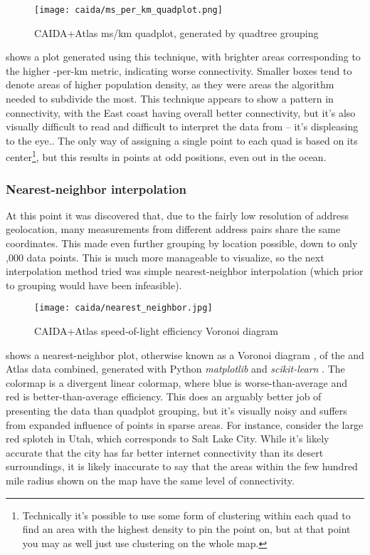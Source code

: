 \begin{figure}[h]
    \centering
    \texttt{[image: caida/ms\_per\_km\_quadplot.png]}
    \caption{CAIDA+Atlas ms/km quadplot, generated by quadtree grouping}
    \label{fig:quadtree_grouping}
\end{figure}

 shows a plot generated using this technique, with brighter areas corresponding to the higher \rtt-per-km metric, indicating worse connectivity. Smaller boxes tend to denote areas of higher population density, as they were areas the algorithm needed to subdivide the most. This technique appears to show a pattern in connectivity, with the East coast having overall better connectivity, but it's also visually difficult to read and difficult to interpret the data from -- it's displeasing to the eye.. The only way of assigning a single point to each quad is based on its center\footnote{Technically it's possible to use some form of clustering within each quad to find an area with the highest density to pin the point on, but at that point you may as well just use clustering on the whole map.}, but this results in points at odd positions, even out in the ocean.

\subsubsection{Nearest-neighbor interpolation}

At this point it was discovered that, due to the fairly low resolution of \ip address geolocation, many measurements from different \ip address pairs share the same coordinates. This made even further grouping by location possible, down to only ,000 data points. This is much more manageable to visualize, so the next interpolation method tried was simple nearest-neighbor interpolation (which prior to grouping would have been infeasible).

\begin{figure}[h]
    \centering
    \texttt{[image: caida/nearest\_neighbor.jpg]}
    \caption{CAIDA+Atlas speed-of-light efficiency Voronoi diagram}
    \label{fig:caida_nearest_neighbor}
\end{figure}

 shows a nearest-neighbor plot, otherwise known as a Voronoi diagram \cite{Malhotra2017LoveNeighbors}, of the \caida and \ripe Atlas data combined, generated with Python \textit{matplotlib} and \textit{scikit-learn} \cite{scipy, matplotlib}. The colormap is a divergent linear colormap, where blue is worse-than-average and red is better-than-average efficiency. This does an arguably better job of presenting the data than quadplot grouping, but it's visually noisy and suffers from expanded influence of points in sparse areas. For instance, consider the large red splotch in Utah, which corresponds to Salt Lake City. While it's likely accurate that the city has far better internet connectivity than its desert surroundings, it is likely inaccurate to say that the areas within the few hundred mile radius shown on the map have the same level of connectivity.

